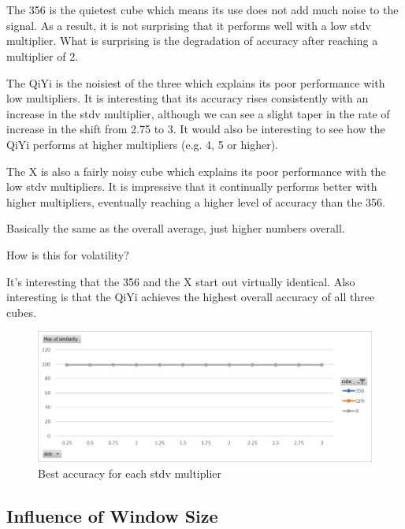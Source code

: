 \begin{figure}
\begin{subfigure}{\textwidth}
    \end{subfigure}\\\\
\end{figure}

The 356 is the quietest cube which means its use does not add much
noise to the signal. As a result, it is not surprising that it performs
well with a low stdv multiplier. What is surprising is the degradation
of accuracy after reaching a multiplier of 2.

The QiYi is the noisiest of the three which explains its poor
performance with low multipliers. It is interesting that its accuracy
rises consistently with an increase in the stdv multiplier, although we
can see a slight taper in the rate of increase in the shift from 2.75
to 3. It would also be interesting to see how the QiYi performs at
higher multipliers (e.g. 4, 5 or higher).

The X is also a fairly noisy cube which explains its poor performance
with the low stdv multipliers. It is impressive that it continually
performs better with higher multipliers, eventually reaching a higher
level of accuracy than the 356.



Basically the same as the overall average, just higher numbers overall.



How is this for volatility? 

It's interesting that the 356 and the X start out virtually identical.
Also interesting is that the QiYi achieves the highest overall accuracy
of all three cubes.


\begin{figure}[h]
    \centering
    \caption{Best accuracy for each stdv multiplier}
    \label{fig:max-similarity-by-stdv}
    \includegraphics[width=0.75\linewidth]{Figures/7 Evaluation/max_similarity_by_stdv.png}
\end{figure}

\subsection{Influence of Window Size}

